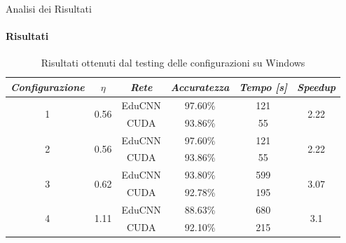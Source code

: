 \documentclass[
 ]{beamer}
\begin{document}
\begin{frame}{Analisi dei Risultati}
    \framesubtitle{Risultati}

        \begin{table}
            \centering
            \renewcommand\arraystretch{1.3}
            \small
            \begin{tabular}{| c | c | c | c | c | c |}
                \hline
                \emph{Configurazione} & $\eta$ & \emph{Rete} & \emph{Accuratezza} & \emph{Tempo [s]} & \emph{Speedup} \\
                \hline
                \multirow{2}{*}{1} & \multirow{2}{*}{0.56} & EduCNN & 97.60\% & 121 & \multirow{2}{*}{2.22} \\ \cline{3-5} 
                                   &                       & CUDA   & 93.86\% & 55  & \\
                \hline
                \multirow{2}{*}{2} & \multirow{2}{*}{0.56} & EduCNN & 97.60\% & 121 & \multirow{2}{*}{2.22} \\ \cline{3-5} 
                                   &                       & CUDA   & 93.86\% & 55  & \\
                \hline
                \multirow{2}{*}{3} & \multirow{2}{*}{0.62} & EduCNN & 93.80\% & 599 & \multirow{2}{*}{3.07} \\ \cline{3-5} 
                                   &                       & CUDA   & 92.78\% & 195  & \\
                \hline
                \multirow{2}{*}{4} & \multirow{2}{*}{1.11} & EduCNN & 88.63\% & 680 & \multirow{2}{*}{3.1} \\ \cline{3-5} 
                                   &                       & CUDA   & 92.10\% & 215  & \\
                \hline
            \end{tabular}
            \caption{Risultati ottenuti dal testing delle configurazioni su Windows}          
        \end{table}    
\end{frame}

\end{document}
